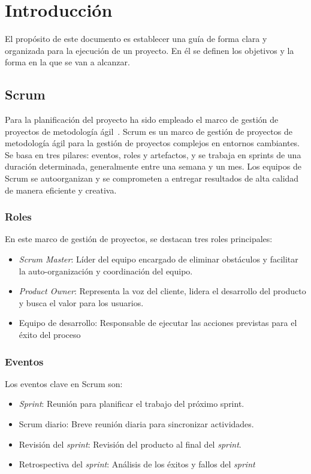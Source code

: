 
\section{Introducción}
El propósito de este documento es establecer una guía de forma clara y organizada para la ejecución de un proyecto. En él se definen los objetivos y la forma en la que se van a alcanzar.


\subsection{Scrum}
Para la planificación del proyecto ha sido empleado el marco de gestión de proyectos de metodología ágil~\cite{scrumMaster2022}. Scrum es un marco de gestión de proyectos de metodología ágil para la gestión de proyectos complejos en entornos cambiantes. Se basa en tres pilares: eventos, roles y artefactos, y se trabaja en sprints de una duración determinada, generalmente entre una semana y un mes. Los equipos de Scrum se autoorganizan y se comprometen a entregar resultados de alta calidad de manera eficiente y creativa.
\subsubsection{Roles}
En este marco de gestión de proyectos, se destacan tres roles principales:

\begin{itemize}
\item \textsl{Scrum Master}: Líder del equipo encargado de eliminar obstáculos y facilitar la auto-organización y coordinación del equipo.
\item \textsl{Product Owner}: Representa la voz del cliente, lidera el desarrollo del producto y busca el valor para los usuarios.
\item Equipo de desarrollo: Responsable de ejecutar las acciones previstas para el éxito del proceso
\end{itemize}
\subsubsection{Eventos}
Los eventos clave en Scrum son:
\begin{itemize}


\item \textsl{Sprint}: Reunión para planificar el trabajo del próximo sprint.
\item Scrum diario: Breve reunión diaria para sincronizar actividades.
\item Revisión del \textsl{sprint}: Revisión del producto al final del \textsl{sprint}.
\item Retrospectiva del \textsl{sprint}: Análisis de los éxitos y fallos del \textsl{sprint}
\end{itemize}




